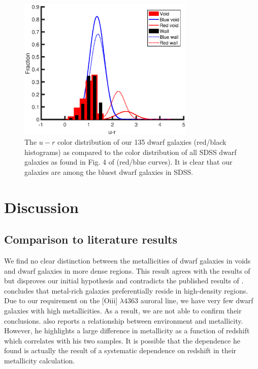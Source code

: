 \begin{figure}
    \centering
    \includegraphics[width=0.75\textwidth]{Images/Paper1/urHist_1sig_I06_dwarf_SF_t3}
    \caption[Color distribution of 135 dwarf galaxy sample compared to SDSS]{The 
    $u-r$ color distribution of our 135 dwarf galaxies (red/black histograms) as 
    compared to the color distribution of all SDSS dwarf galaxies as found in 
    Fig. 4 of \cite{Hoyle12} (red/blue curves).  It is clear that our galaxies 
    are among the bluest dwarf galaxies in SDSS.}
    \label{fig:colorHist}
\end{figure}



\section{Discussion}

\subsection{Comparison to literature results}

We find no clear distinction between the metallicities of dwarf galaxies in 
voids and dwarf galaxies in more dense regions.  This result agrees with the 
results of \citet{Mouhcine07, Cooper08, Nicholls14a, Kreckel15} but disproves 
our initial hypothesis and contradicts the published results of 
\cite{Pustilnik06, Pustilnik11a, Pustilnik14, SanchezAlmeida16}.  
\cite{Cooper08} concludes that metal-rich galaxies preferentially reside in 
high-density regions.  Due to our requirement on the [O{\sc iii}] $\lambda 4363$ 
auroral line, we have very few dwarf galaxies with high metallicities.  As a 
result, we are not able to confirm their conclusions. \cite{Deng11} also reports 
a relationship between environment and metallicity.  However, he highlights a 
large difference in metallicity as a function of redshift which correlates with 
his two samples.  It is possible that the dependence he found is actually the 
result of a systematic dependence on redshift in their metallicity calculation.

